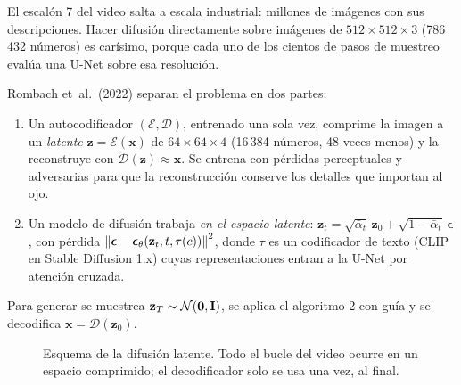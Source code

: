 \documentclass[11pt,letterpaper,oneside]{report}
\newcommand{\xb}{\mathbf{x}}
\newcommand{\eb}{\boldsymbol{\epsilon}}
\newcommand{\zb}{\mathbf{z}}
\newcommand{\Ib}{\mathbf{I}}
\newcommand{\ab}{\bar{\alpha}}
\newcommand{\epst}{\boldsymbol{\epsilon}_\theta}
\begin{document}
El escalón 7 del video salta a escala industrial: millones de imágenes con sus descripciones. Hacer difusión directamente sobre imágenes de $512\times512\times3$ (786\,432 números) es carísimo, porque cada uno de los cientos de pasos de muestreo evalúa una U-Net sobre esa resolución.

\begin{definicion}
Rombach et~al.\ (2022) separan el problema en dos partes:
\begin{enumerate}
  \item Un autocodificador $(\mathcal E,\mathcal D)$, entrenado una sola vez, comprime la imagen a un \emph{latente} $\zb=\mathcal E(\xb)$ de $64\times64\times4$ (16\,384 números, 48 veces menos) y la reconstruye con $\mathcal D(\zb)\approx\xb$. Se entrena con pérdidas perceptuales y adversarias para que la reconstrucción conserve los detalles que importan al ojo.
  \item Un modelo de difusión trabaja \emph{en el espacio latente}: $\zb_t=\sqrt{\ab_t}\,\zb_0+\sqrt{1-\ab_t}\,\eb$, con pérdida $\norm{\eb-\epst(\zb_t,t,\tau(c))}^2$, donde $\tau$ es un codificador de texto (CLIP en Stable Diffusion 1.x) cuyas representaciones entran a la U-Net por atención cruzada.
\end{enumerate}
Para generar se muestrea $\zb_T\sim\Normal(\mathbf 0,\Ib)$, se aplica el algoritmo 2 con guía y se decodifica $\xb=\mathcal D(\zb_0)$.
\end{definicion}

\begin{figure}[H]
\centering
{}
\caption{Esquema de la difusión latente. Todo el bucle del video ocurre en un espacio comprimido; el decodificador solo se usa una vez, al final.}
\label{fig:latente}
\end{figure}
\end{document}
